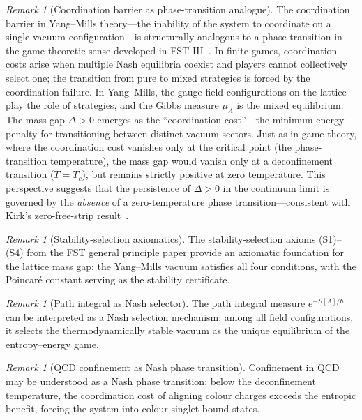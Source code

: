 \documentclass[12pt,a4paper]{article}
\theoremstyle{definition}
\theoremstyle{plain}
\theoremstyle{remark}
\newtheorem{remark}[definition]{Remark}
\begin{document}
\begin{remark}[Coordination barrier as phase-transition analogue]
\label{rem:coordination-barrier}
The coordination barrier in Yang--Mills theory---the inability of
the system to coordinate on a single vacuum configuration---is
structurally analogous to a phase transition in the game-theoretic
sense developed in FST-III~\cite{FST-Unified2026}.  In finite games,
coordination costs arise when multiple Nash equilibria coexist
and players cannot collectively select one; the transition from
pure to mixed strategies is forced by the coordination failure.
In Yang--Mills, the gauge-field configurations on the lattice
play the role of strategies, and the Gibbs measure $\mu_\Lambda$
is the mixed equilibrium.  The mass gap $\Delta > 0$ emerges as
the ``coordination cost''---the minimum energy penalty for
transitioning between distinct vacuum sectors.  Just as in game
theory, where the coordination cost vanishes only at the critical
point (the phase-transition temperature), the mass gap would
vanish only at a deconfinement transition ($T = T_c$), but
remains strictly positive at zero temperature.  This perspective
suggests that the persistence of $\Delta > 0$ in the continuum
limit is governed by the \emph{absence} of a zero-temperature
phase transition---consistent with Kirk's zero-free-strip
result~\cite{Kirk2026b}.
\end{remark}

\begin{remark}[Stability-selection axiomatics]
\label{rem:stability-selection}
The stability-selection axioms (S1)--(S4) from the FST general principle paper provide an axiomatic foundation for the lattice mass gap: the Yang--Mills vacuum satisfies all four conditions, with the Poincar\'e constant serving as the stability certificate.
\end{remark}

\begin{remark}[Path integral as Nash selector]
\label{rem:path-integral-nash}
The path integral measure $e^{-S[A]/\hbar}$ can be interpreted as a Nash selection mechanism: among all field configurations, it selects the thermodynamically stable vacuum as the unique equilibrium of the entropy--energy game.
\end{remark}

\begin{remark}[QCD confinement as Nash phase transition]
\label{rem:qcd-confinement-nash}
Confinement in QCD may be understood as a Nash phase transition: below the deconfinement temperature, the coordination cost of aligning colour charges exceeds the entropic benefit, forcing the system into colour-singlet bound states.
\end{remark}
\end{document}
